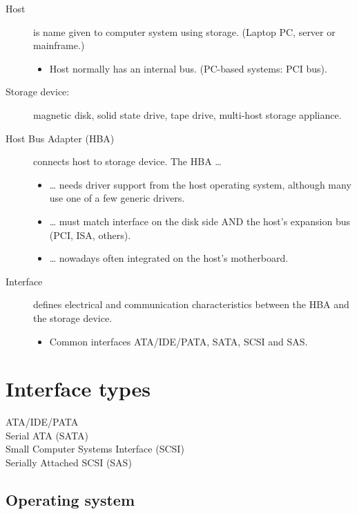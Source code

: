 \begin{description}
\item[Host]
is name given to computer system using storage. (Laptop PC, server or
mainframe.)

\begin{itemize}

\item
  Host normally has an internal bus. (PC-based systems: PCI bus).
\end{itemize}
\item[Storage device:]
magnetic disk, solid state drive, tape drive, multi-host storage
appliance.
\item[Host Bus Adapter (HBA)]
connects host to storage device. The HBA \ldots{}

\begin{itemize}
\item
  \ldots{} needs driver support from the host operating system, although
  many use one of a few generic drivers.
\item
  \ldots{} must match interface on the disk side AND the host's
  expansion bus (PCI, ISA, others).
\item
  \ldots{} nowadays often integrated on the host's motherboard.
\end{itemize}
\item[Interface]
defines electrical and communication characteristics between the HBA and
the storage device.

\begin{itemize}

\item
  Common interfaces ATA/IDE/PATA, SATA, SCSI and SAS.
\end{itemize}
\end{description}

\section{Interface types}\label{interface-types}

\begin{description}
\item[ATA/IDE/PATA]
\item[Serial ATA (SATA)]
\item[Small Computer Systems Interface (SCSI)]
\item[Serially Attached SCSI (SAS)]
\end{description}

\subsection{Operating system}\label{operating-system}

